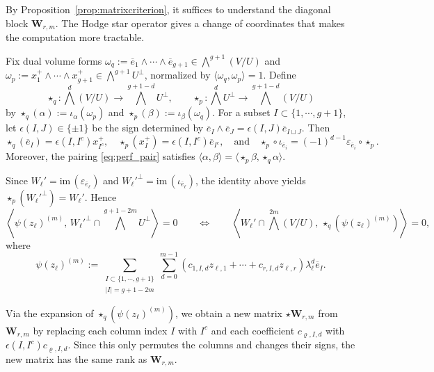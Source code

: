 \documentclass[12pt, letterpaper]{amsart}
\theoremstyle{definition}
\newcommand{\bW}{\mathbf{W} }
\newcommand{\lbd}{\lambda}
\def\im{\mathrm{im}\, }
\begin{document}
By Proposition~\ref{prop:matrixcriterion}, it suffices to understand the diagonal block \(\bW_{r,m}\). The Hodge star operator gives a change of coordinates that makes the computation more tractable.

Fix dual volume forms \(\omega_q:=\overline e_1\wedge\cdots\wedge\overline e_{g+1}\in \bigwedge^{g+1}(V/U)\) and \(\omega_p:=x_1^+\wedge\cdots\wedge x_{g+1}^+\in \bigwedge^{g+1}U^\perp\), normalized by \(\langle \omega_q,\omega_p\rangle=1\). Define
\[\star_q:\bigwedge^d(V/U)\longrightarrow \bigwedge^{g+1-d}U^\perp,\qquad\star_p:\bigwedge^d U^\perp\longrightarrow \bigwedge^{g+1-d}(V/U)\]
by \(\star_q(\alpha):=\iota_\alpha(\omega_p)\) and \(\star_p(\beta):=\iota_\beta(\omega_q)\). For a subset \(I\subset\{1,\cdots,g+1\}\), let \(\epsilon(I,J)\in\{\pm1\}\) be the sign determined by \(\overline e_I\wedge\overline e_J=\epsilon(I,J)\overline e_{I\sqcup J}\). Then
\begin{equation}\label{eqn:Hodgestar}
\star_q(\overline e_I)=\epsilon(I,I^c)x_{I^c}^+, \quad\star_p(x_I^+)=\epsilon(I,I^c)\overline e_{I^c},\quad \text{and} \quad\star_p\circ\iota_{\overline e_i}=(-1)^{d-1}\varepsilon_{\overline e_i}\circ\star_p.
\end{equation}
Moreover, the pairing \eqref{eq:perf_pair} satisfies \(\langle \alpha,\beta\rangle=\langle \star_p\beta,\star_q\alpha\rangle\).

Since \(W_\ell'=\im(\varepsilon_{\overline e_\ell})\) and \(W_\ell'^\perp=\im(\iota_{\overline e_\ell})\), the identity above yields \(\star_p(W_\ell'^\perp)=W_\ell'\). Hence
\[
\left\langle \psi(z_\ell)^{(m)},\,W_\ell'^\perp\cap \bigwedge^{g+1-2m}U^\perp\right\rangle=0 \qquad\Longleftrightarrow\qquad \left\langle W_\ell'\cap \bigwedge^{2m}(V/U),\,\star_q(\psi(z_\ell)^{(m)})\right\rangle=0,
\]
where
\[\psi(z_\ell)^{(m)}:=\sum_{\substack{I\subset\{1,\cdots,g+1\}\\|I|=g+1-2m}}\sum_{d=0}^{m-1}(c_{1,I,d}z_{\ell,1}+\cdots+c_{r,I,d}z_{\ell,r})\lbd_\ell^d\overline e_I.\]

Via the expansion of \(\star_q(\psi(z_\ell)^{(m)})\), we obtain a new matrix \(\star\bW_{r,m}\) from \(\bW_{r,m}\) by replacing each column index \(I\) with \(I^c\) and each coefficient \(c_{\varrho,I,d}\) with \(\epsilon(I,I^c)c_{\varrho,I,d}\). Since this only permutes the columns and changes their signs, the new matrix has the same rank as \(\bW_{r,m}\).
\end{document}

